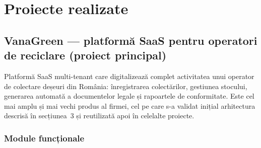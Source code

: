\documentclass[11pt, a4paper]{article}
\begin{document}

\section{Proiecte realizate}

\subsection{VanaGreen --- platformă SaaS pentru operatori de reciclare (proiect principal)}

Platformă SaaS multi-tenant care digitalizează complet activitatea unui operator de colectare
deșeuri din România: înregistrarea colectărilor, gestiunea stocului, generarea automată a
documentelor legale și rapoartele de conformitate. Este cel mai amplu și mai vechi produs al
firmei, cel pe care s-a validat inițial arhitectura descrisă în secțiunea~3 și reutilizată apoi
în celelalte proiecte.

\subsubsection{Module funcționale}
\end{document}
